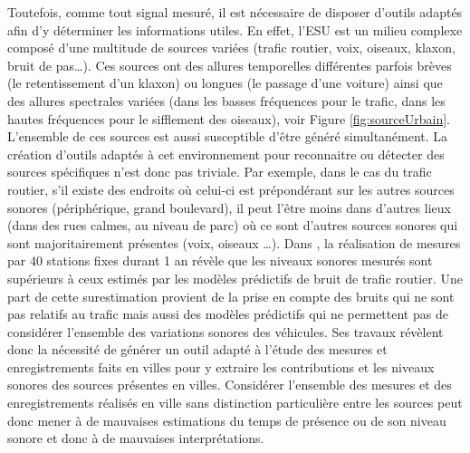 Toutefois, comme tout signal mesuré, il est nécessaire de disposer d'outils adaptés afin d'y déterminer les informations utiles. En effet, l'ESU est un milieu complexe composé d'une multitude de sources variées (trafic routier, voix, oiseaux, klaxon, bruit de pas\dots). Ces sources ont des allures temporelles différentes parfois brèves (le retentissement d'un klaxon) ou longues (le passage d'une voiture) ainsi que des allures spectrales variées (dans les basses fréquences pour le trafic, dans les hautes fréquences pour le sifflement des oiseaux), voir Figure \ref{fig:sourceUrbain}. L'ensemble de ces sources est aussi susceptible d'être généré simultanément. La création d'outils adaptés à cet environnement pour reconnaitre ou détecter des sources spécifiques n'est donc pas triviale. Par exemple, dans le cas du trafic routier, s'il existe des endroits où celui-ci est prépondérant sur les autres sources sonores (périphérique, grand boulevard), il peut l'être moins dans d'autres lieux (dans des rues calmes, au niveau de parc) où ce sont d'autres sources sonores qui sont majoritairement présentes (voix, oiseaux \dots). Dans \cite{Mioduszewski}, la réalisation de mesures par 40 stations fixes durant 1 an révèle que les niveaux sonores mesurés sont supérieurs à ceux estimés par les modèles prédictifs de bruit de trafic routier. Une part de cette surestimation provient de la prise en compte des bruits qui ne sont pas relatifs au trafic  mais aussi des modèles prédictifs qui ne permettent pas de considérer l'ensemble des variations sonores des véhicules. Ses travaux révèlent donc la nécessité de générer un outil adapté à l'étude des mesures et enregistrements faits en villes pour y extraire les contributions et les niveaux sonores des sources présentes en villes. Considérer l'ensemble des mesures et des enregistrements réalisés en ville sans distinction particulière entre les sources peut donc mener à de mauvaises estimations du temps de présence ou de son niveau sonore et donc à de mauvaises interprétations.\\

